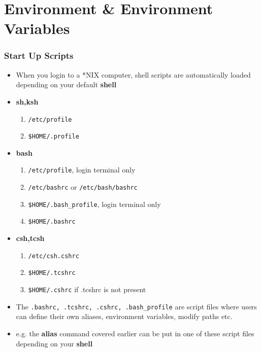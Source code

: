 \documentclass[10pt,t]{beamer}
\begin{document}
\section{Environment \& Environment Variables}
\begin{frame}
  \frametitle{Start Up Scripts}
  \begin{itemize}
    \item When you login to a *NIX computer, shell scripts are automatically loaded depending on your default \textbf{\color{lubrown}shell}
    \item \textbf{\color{lubrown}sh,ksh}
    \begin{enumerate}
        \item \texttt{\color{blue}/etc/profile}
        \item \texttt{\color{blue}\$HOME/.profile}
    \end{enumerate}
    \item \textbf{\color{lubrown}bash}
    \begin{enumerate}
        \item \texttt{\color{blue}/etc/profile}, login terminal only
        \item \texttt{\color{blue}/etc/bashrc} or \texttt{\color{blue}/etc/bash/bashrc}
        \item \texttt{\color{blue}\$HOME/.bash\_profile}, login terminal only
        \item \texttt{\color{blue}\$HOME/.bashrc}
    \end{enumerate}
    \item \textbf{\color{lubrown}csh,tcsh}
    \begin{enumerate}
        \item \texttt{\color{blue}/etc/csh.cshrc}
        \item \texttt{\color{blue}\$HOME/.tcshrc}
        \item \texttt{\color{blue}\$HOME/.cshrc} if .tcshrc is not present
    \end{enumerate}
    \item The \texttt{\color{blue}.bashrc, .tcshrc, .cshrc, .bash\_profile} are script files where users can define their own aliases, environment variables, modify paths etc.
    \item e.g. the \textbf{\color{lubrown}alias} command covered earlier can be put in one of these script files depending on your \textbf{\color{lubrown}shell}
  \end{itemize}
\end{frame}
\end{document}
